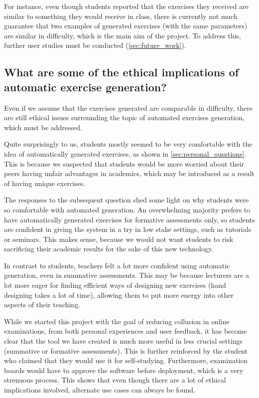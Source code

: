 \documentclass{l4proj}
\begin{document}
For instance, even though students reported that the exercises they received are similar to something they would receive in class, there is currently not much guarantee that two examples of generated exercises (with the same parameters) are similar in difficulty, which is the main aim of the project. To address this, further user studies must be conducted (\autoref{sec:future_work}).

\subsection*{What are some of the ethical implications of automatic exercise generation?}

Even if we assume that the exercises generated are comparable in difficulty, there are still ethical issues surrounding the topic of automated exercises generation, which must be addressed.

Quite surprisingly to us, students mostly seemed to be very comfortable with the idea of automatically generated exercises, as shown in \autoref{sec:personal_questions}. This is because we suspected that students would be more worried about their peers having unfair advantages in academics, which may be introduced as a result of having unique exercises. 

The responses to the subsequent question shed some light on why students were so comfortable with automated generation. An overwhelming majority prefers to have automatically generated exercises for formative assessments only, so students are confident in giving the system in a try in low stake settings, such as tutorials or seminars. This makes sense, because we would not want students to risk sacrificing their academic results for the sake of this new technology.

In contrast to students, teachers felt a lot more confident using automatic generation, even in summative assessments. This may be because lecturers are a lot more eager for finding efficient ways of designing new exercises (hand designing takes a lot of time), allowing them to put more energy into other aspects of their teaching.

While we started this project with the goal of reducing collusion in online examinations, from both personal experiences and user feedback, it has become clear that the tool we have created is much more useful in less crucial settings (summative or formative assessments). This is further reinforced by the student who claimed that they would use it for self-studying. Furthermore, examination boards would have to approve the software before deployment, which is a very strenuous process. This shows that even though there are a lot of ethical implications involved, alternate use cases can always be found.
\end{document}
